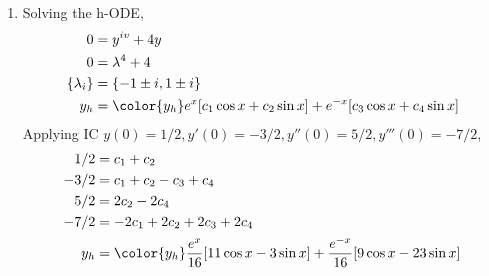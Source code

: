 \begin{enumerate}
    \item Solving the h-ODE,
          \begin{align}
              0               & = y^{iv} + 4y                                  \\
              0               & = \lambda^{4} + 4                              \\
              \{\lambda_{i}\} & = \{-1 \pm i, 1 \pm i\}                        \\
              y_{h}           & = \color{y_h} e^{x}[c_{1}\cos x + c_{2}\sin x]
              + e^{-x}[c_{3}\cos x + c_{4}\sin x]
          \end{align}
          Applying IC $ y(0) = 1/2, y'(0) = -3/2, y''(0) = 5/2, y'''(0) = -7/2 $,
          \begin{align}
              1/2   & = c_{1} + c_{2}                                    \\
              -3/2  & = c_{1} + c_{2} - c_{3} + c_{4}                    \\
              5/2   & = 2c_{2} - 2c_{4}                                  \\
              -7/2  & = -2c_{1} + 2c_{2} + 2c_{3} + 2c_{4}               \\
              y_{h} & = \color{y_h} \frac{e^{x}}{16}[11\cos x - 3\sin x]
              + \frac{e^{-x}}{16}[9\cos x - 23\sin x]
          \end{align}
          \begin{figure}[H]
              \centering
          \end{figure}


\end{enumerate}
